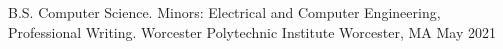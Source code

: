 

\begin{cventries}

  \cventry
    {B.S. Computer Science. Minors: Electrical and Computer Engineering, Professional Writing.} %
    {Worcester Polytechnic Institute} %
    {Worcester, MA} %
    {May 2021} %
    {}
\end{cventries}

